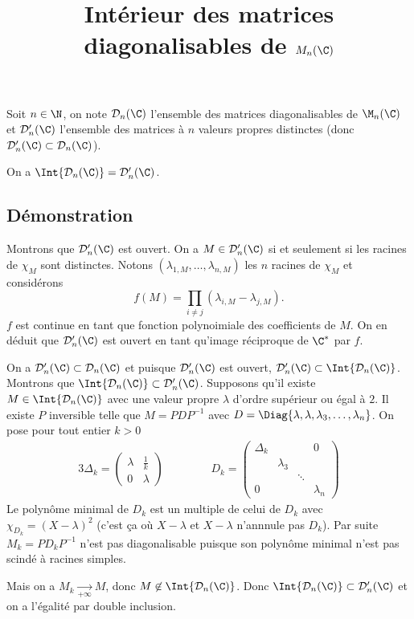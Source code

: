 \documentclass[fontsize=12pt,twoside=false,parskip=half,french]{scrartcl}
\title{Intérieur des matrices diagonalisables de $M_n(\C)$}
\date{}
\author{}
\newcommand*{\D}{\mathcal{D}_n(\C)}
\newcommand*{\Dn}{\mathcal{D}_n'(\C)}
\begin{document}
\maketitle
   Soit $n \in \N$, on note $\D$ l'ensemble des matrices
   diagonalisables de $\M_n(\C)$ et $\Dn$ l'ensemble des
   matrices à $n$ valeurs propres distinctes (donc $\Dn \subset \D$). 
   \begin{Theoreme}[Intérieur de $\D$]
      On a $\Int{\D} = \Dn$.
   \end{Theoreme}
   \subsection{Démonstration}
      Montrons que $\Dn$ est ouvert. On a $M \in \Dn$ si et seulement si 
      les racines de $\chi_M$ sont distinctes. Notons 
      $(\lambda_{1,M}, \ldots, \lambda_{n, M})$ 
      les $n$ racines de $\chi_M$ et considérons
      \[
        f(M) = \prod_{i \neq j} (\lambda_{i,M} - \lambda_{j, M}).
      \]
      $f$ est continue en tant que fonction polynoimiale des coefficients
      de $M$. On en déduit que $\Dn$ est ouvert en tant qu'image réciproque de
      $\C^*$ par $f$.
      
      On a $\Dn \subset \D$ et puisque $\Dn$ est ouvert, $\Dn \subset \Int{\D}$.
      Montrons que $\Int{\D} \subset \Dn$. Supposons qu'il existe $M \in \Int{\D}$ 
      avec une valeur propre $\lambda$ d'ordre supérieur ou égal à $2$. Il existe
      $P$ inversible telle que $M = PDP^{-1}$ avec 
      $D = \Diag{\lambda, \lambda, \lambda_3, \ldots, \lambda_n}$. On pose pour
      tout entier $k > 0$
      \begin{alignat*}{3}
         \Delta_k = \begin{pmatrix}
            \lambda & \frac{1}{k}\\
            0 & \lambda
         \end{pmatrix}  
         & & \quad & &
         D_k = \begin{pmatrix}
             \Delta_k &   & & 0\\
                    &  \lambda_3 & &\\ 
                    &   &    \ddots & \\
                  0 &           & & \lambda_n
          \end{pmatrix} 
      \end{alignat*}
      Le polynôme minimal de $D_k$ est un multiple de celui de $D_k$ avec
      $\chi_{D_k} = (X - \lambda)^2$ (c'est ça où $X - \lambda$ et $X - \lambda$
      n'annnule pas $D_k$). Par suite $M_k = PD_kP^{-1}$ n'est pas diagonalisable
      puisque son polynôme minimal n'est pas scindé à racines simples.
      
      Mais on a $M_k \underset{+\infty}{\to} M$, donc $M \not\in \Int{\D}$.
      Donc $\Int{\D} \subset \Dn$ et on a l'égalité par double inclusion.
\end{document}
